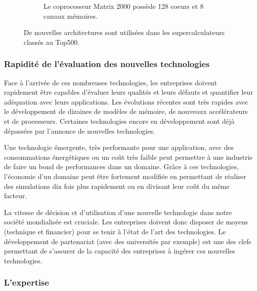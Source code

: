 \begin{figure}[t!]
\begin{subfigure}[t]{0.48\textwidth}
                \caption{\label{fig:edlp_matrix_2000}Le coprocesseur Matrix 2000 possède 128 coeurs et 8 canaux mémoires.}
            \end{subfigure}
            \caption{\label{fig:new_proc} De nouvelles architectures sont utilisées dans les supercalculateurs classés au Top500.}
        \end{figure}

           
    \subsubsection{Rapidité de l'évaluation des nouvelles technologies} \label{sec:edl_chal_vitesse}
        
        Face à l'arrivée de ces nombreuses technologies, les entreprises doivent rapidement être capables d'évaluer leurs qualités et leurs défauts et quantifier leur adéquation avec leurs applications. Les évolutions récentes sont très rapides avec le développement de dizaines de modèles de mémoire, de nouveaux accélérateurs et de processeurs. Certaines technologies encore en développement sont déjà dépassées par l’annonce de nouvelles technologies.
        
        Une technologie émergente, très performante pour une application, avec des consommations énergétiques ou un coût très faible peut permettre à une industrie de faire un bond de performances dans un domaine. Grâce à ces technologies, l'économie d'un domaine peut être fortement modifiée en permettant de réaliser des simulations dix fois plus rapidement ou en divisant leur coût du même facteur.
                
        La vitesse de décision et d'utilisation d'une nouvelle technologie dans notre société mondialisée est cruciale. Les entreprises doivent donc disposer de moyens (technique et financier) pour se tenir à l'état de l'art des technologies. Le développement de partenariat (avec des universités par exemple) est une des clefs permettant de s’assurer de la capacité des entreprises à ingérer ces nouvelles technologies.


    \subsubsection{L'expertise}\label{sec:edl_chal_expertise}

